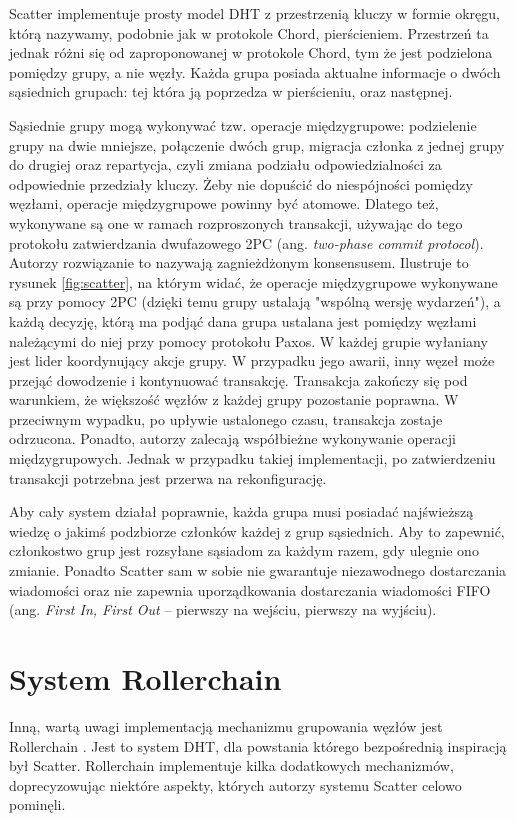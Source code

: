 \documentclass[12pt, twoside, openany]{report}
\begin{document}
Scatter implementuje prosty model DHT z przestrzenią kluczy w formie okręgu, którą nazywamy, podobnie jak w protokole Chord, pierścieniem. Przestrzeń ta jednak różni się od zaproponowanej w protokole Chord, tym że jest podzielona pomiędzy grupy, a nie węzły. Każda grupa posiada aktualne informacje o dwóch sąsiednich grupach: tej która ją poprzedza w pierścieniu, oraz następnej.

Sąsiednie grupy mogą wykonywać tzw. operacje międzygrupowe: podzielenie grupy na dwie mniejsze, połączenie dwóch grup, migracja członka z jednej grupy do drugiej oraz repartycja, czyli zmiana podziału odpowiedzialności za odpowiednie przedziały kluczy. Żeby nie dopuścić do niespójności pomiędzy węzłami, operacje międzygrupowe powinny być atomowe. Dlatego też, wykonywane są one w ramach rozproszonych transakcji, używając do tego protokołu zatwierdzania dwufazowego 2PC (ang. \textit{two-phase commit protocol}). Autorzy rozwiązanie to nazywają zagnieżdżonym konsensusem. Ilustruje to rysunek \ref{fig:scatter}, na którym widać, że operacje międzygrupowe wykonywane są przy pomocy 2PC (dzięki temu grupy ustalają "wspólną wersję wydarzeń"), a każdą decyzję, którą ma podjąć dana grupa ustalana jest pomiędzy węzłami należącymi do niej przy pomocy protokołu Paxos. W każdej grupie wyłaniany jest lider koordynujący akcje grupy. W przypadku jego awarii, inny węzeł może przejąć dowodzenie i kontynuować transakcję. Transakcja zakończy się pod warunkiem, że większość węzłów z każdej grupy pozostanie poprawna. W przeciwnym wypadku, po upływie ustalonego czasu, transakcja zostaje odrzucona. Ponadto, autorzy zalecają współbieżne wykonywanie operacji międzygrupowych. Jednak w przypadku takiej implementacji, po zatwierdzeniu transakcji potrzebna jest przerwa na rekonfigurację.

Aby cały system działał poprawnie, każda grupa musi posiadać najświeższą wiedzę o jakimś podzbiorze członków każdej z grup sąsiednich. Aby to zapewnić, członkostwo grup jest rozsyłane sąsiadom za każdym razem, gdy ulegnie ono zmianie. Ponadto Scatter sam w sobie nie gwarantuje niezawodnego dostarczania wiadomości oraz nie zapewnia uporządkowania dostarczania wiadomości FIFO (ang. \textit{First In, First Out} – pierwszy na wejściu, pierwszy na wyjściu).

\section{System Rollerchain}
\label{subch_rollerchain}

Inną, wartą uwagi implementacją mechanizmu grupowania węzłów jest Rollerchain \cite{bib:rollerchain}. Jest to system DHT, dla powstania którego bezpośrednią inspiracją był Scatter. Rollerchain implementuje kilka dodatkowych mechanizmów, doprecyzowując niektóre aspekty, których autorzy systemu Scatter celowo pominęli.
\end{document}
